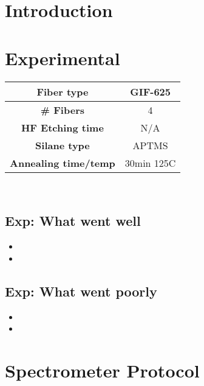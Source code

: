 \section{Introduction}

\section{Experimental}


\begin{center}
\begin{tabular}{| c | c |}
 \hline
 {\bf Fiber type} & GIF-625 \\ \hline
 {\bf \# Fibers} & 4  \\ \hline
 {\bf HF Etching time} & N/A \\ \hline
 {\bf Silane type} & APTMS \\ \hline
 {\bf Annealing time/temp} & 30min 125C  \\ \hline
\end{tabular}
\end{center}

\\


\subsection{Exp: {\color{blue} What went well}}

\begin{itemize}
\item{}
\item{}
\end{itemize}

\subsection{Exp: {\color{red} What went poorly}}

\begin{itemize}
\item{}
\item{}
\end{itemize}

\section{Spectrometer Protocol}



